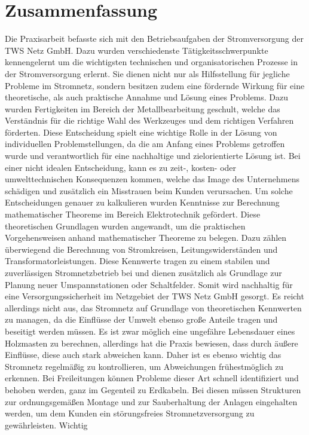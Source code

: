 \chapter{Zusammenfassung}
\label{cha:zusammenfassung}

Die Praxisarbeit befasste sich mit den Betriebsaufgaben der Stromversorgung der TWS Netz GmbH. Dazu wurden verschiedenste Tätigkeitsschwerpunkte kennengelernt 
um die wichtigsten technischen und organisatorischen Prozesse in der Stromversorgung erlernt. Sie dienen nicht nur als Hilfsstellung für jegliche Probleme im 
Stromnetz, sondern besitzen zudem eine fördernde Wirkung für eine theoretische, als auch praktische Annahme und Lösung eines Problems. Dazu wurden Fertigkeiten 
im Bereich der Metallbearbeitung geschult, welche das Verständnis für die richtige Wahl des Werkzeuges und dem richtigen Verfahren förderten. Diese 
Entscheidung spielt eine wichtige Rolle in der Lösung von individuellen Problemstellungen, da die am Anfang eines Problems getroffen wurde und verantwortlich 
für eine nachhaltige und zielorientierte Lösung ist. Bei einer nicht idealen Entscheidung, kann es zu zeit-, kosten- oder umwelttechnischen Konsequenzen 
kommen, welche das Image des Unternehmens schädigen und zusätzlich ein Misstrauen beim Kunden verursachen. Um solche Entscheidungen genauer zu kalkulieren 
wurden Kenntnisse zur Berechnung mathematischer Theoreme im Bereich Elektrotechnik gefördert. Diese theoretischen Grundlagen wurden angewandt, um die 
praktischen Vorgehensweisen anhand mathematischer Theoreme zu belegen. Dazu zählen überwiegend die Berechnung von Stromkreisen, Leitungswiderständen und 
Transformatorleistungen. Diese Kennwerte tragen zu einem stabilen und zuverlässigen Stromnetzbetrieb bei und dienen zusätzlich als Grundlage zur Planung 
neuer Umspannstationen oder Schaltfelder. Somit wird nachhaltig für eine Versorgungssicherheit im Netzgebiet der TWS Netz GmbH gesorgt. Es reicht allerdings 
nicht aus, das Stromnetz auf Grundlage von theoretischen Kennwerten zu managen, da die Einflüsse der Umwelt ebenso große Anteile tragen und beseitigt werden 
müssen. Es ist zwar möglich eine ungefähre Lebensdauer \zB eines Holzmasten zu berechnen, allerdings hat die Praxis bewiesen, dass durch äußere Einflüsse, 
diese auch stark abweichen kann. Daher ist es ebenso wichtig das Stromnetz regelmäßig zu kontrollieren, um Abweichungen frühestmöglich zu erkennen. Bei 
Freileitungen können Probleme dieser Art schnell identifiziert und behoben werden, ganz im Gegenteil zu Erdkabeln. Bei diesen müssen Strukturen zur 
ordnungsgemäßen Montage und zur Sauberhaltung der Anlagen eingehalten werden, um dem Kunden ein störungsfreies Stromnetzversorgung zu gewährleisten. Wichtig 
